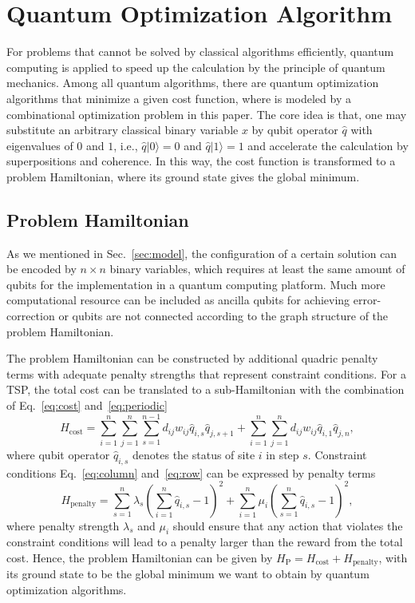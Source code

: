 \documentclass[aps,pra,twocolumn,superscriptaddress]{revtex4-2}
\begin{document}
\section{Quantum Optimization Algorithm\label{sec:qoa}}
For problems that cannot be solved by classical algorithms efficiently, quantum computing is applied to speed up the calculation by the principle of quantum mechanics. Among all quantum algorithms, there are quantum optimization algorithms that minimize a given cost function, where is modeled by a combinational optimization problem in this paper. The core idea is that, one may substitute an arbitrary  classical binary variable $x$ by qubit operator $\hat{q}$ with eigenvalues of $0$ and $1$, i.e., $\hat{q}|0\rangle=0$ and $\hat{q}|1\rangle=1$ and accelerate the calculation by superpositions and coherence. In this way, the cost function is transformed to a problem Hamiltonian, where its ground state gives the global minimum.
\subsection{Problem Hamiltonian}
As we mentioned in Sec.~\ref{sec:model}, the configuration of a certain solution can be encoded by $n\times n$ binary variables, which requires at least the same amount of qubits for the implementation in a quantum computing platform. Much more computational resource can be included as ancilla qubits for achieving error-correction or qubits are not connected according to the graph structure of the problem Hamiltonian.

The problem Hamiltonian can be constructed by additional quadric penalty terms with adequate penalty strengths that represent constraint conditions. For a TSP, the total cost can be translated to a sub-Hamiltonian with the combination of Eq.~\eqref{eq:cost} and~\eqref{eq:periodic}
\begin{equation}
H_{\text{cost}}=\sum_{i=1}^n\sum_{j=1}^n\sum_{s=1}^{n-1}d_{ij}w_{ij}\hat{q}_{i,s}\hat{q}_{j,s+1}+\sum_{i=1}^n\sum_{j=1}^nd_{ij}w_{ij}\hat{q}_{i,1}\hat{q}_{j,n},
\end{equation}
where qubit operator $\hat{q}_{i,s}$ denotes the status of site $i$ in step $s$. Constraint conditions Eq.~\eqref{eq:column} and~\eqref{eq:row} can be expressed by penalty terms
\begin{equation}
H_{\text{penalty}}=\sum_{s=1}^n\lambda_s(\sum_{i=1}^n\hat{q}_{i,s}-1)^2+\sum_{i=1}^n\mu_i(\sum_{s=1}^n\hat{q}_{i,s}-1)^2,
\end{equation}
where penalty strength $\lambda_s$ and $\mu_i$ should ensure that any action that violates the constraint conditions will lead to a penalty larger than the reward from the total cost. Hence, the problem Hamiltonian can be given by $H_{\text{P}}=H_{\text{cost}}+H_{\text{penalty}}$, with its ground state to be the global minimum we want to obtain by quantum optimization algorithms.
\end{document}
